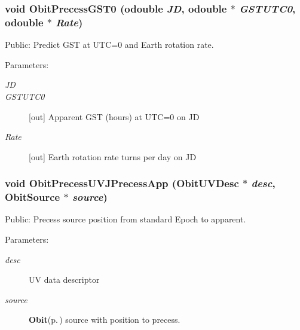 \subsubsection{\setlength{\rightskip}{0pt plus 5cm}void Obit\-Precess\-GST0 ({\bf odouble} {\em JD}, {\bf odouble} $\ast$ {\em GSTUTC0}, {\bf odouble} $\ast$ {\em Rate})}\label{ObitPrecess_8h_a1}


Public: Predict GST at UTC=0 and Earth rotation rate. 

\begin{Desc}
\item[Parameters:]
\begin{description}
\item[{\em JD}]\item[{\em GSTUTC0}][out] Apparent GST (hours) at UTC=0 on JD \item[{\em Rate}][out] Earth rotation rate turns per day on JD \end{description}
\end{Desc}
\subsubsection{\setlength{\rightskip}{0pt plus 5cm}void Obit\-Precess\-UVJPrecess\-App ({\bf Obit\-UVDesc} $\ast$ {\em desc}, {\bf Obit\-Source} $\ast$ {\em source})}\label{ObitPrecess_8h_a0}


Public: Precess source position from standard Epoch to apparent. 

\begin{Desc}
\item[Parameters:]
\begin{description}
\item[{\em desc}]UV data descriptor \item[{\em source}]{\bf Obit}{\rm (p.\,\pageref{structObit})} source with position to precess. \end{description}
\end{Desc}
